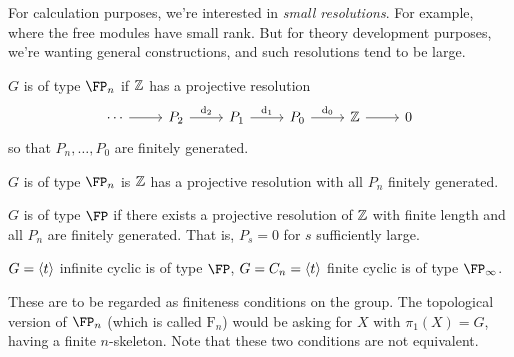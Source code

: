 \documentclass{article}
\begin{document}
For calculation purposes, we're interested in \emph{small resolutions}. For example, where the free modules have small rank. But for theory development purposes, we're wanting general constructions, and such resolutions tend to be large.

\begin{definition}
    \(G\) is of type \(\FP_n\) if \(\mathbb{Z}\) has a projective resolution
    \[\begin{tikzcd}
        \cdots & {P_2} & {P_1} & {P_0} & \Z & 0
        \arrow[from=1-1, to=1-2]
        \arrow["{\dd_2}", from=1-2, to=1-3]
        \arrow["{\dd_1}", from=1-3, to=1-4]
        \arrow["{\dd_0}", from=1-4, to=1-5]
        \arrow[from=1-5, to=1-6]
    \end{tikzcd}\]
    so that \(P_n, \dots, P_0\) are finitely generated. 
    
    \(G\) is of type \(\FP_n\) is \(\mathbb{Z}\) has a projective resolution with all \(P_n\) finitely generated. 
    
    \(G\) is of type \(\FP\) if there exists a projective resolution of \(\mathbb{Z}\) with finite length and all \(P_n\) are finitely generated. That is, \(P_s = 0\) for \(s\) sufficiently large.
\end{definition}

\begin{example}
    \(G = \left\langle t \right\rangle\) infinite cyclic is of type \(\FP\), \(G = C_n = \left\langle t \right\rangle\) finite cyclic is of type \(\FP_\infty\).
\end{example}

These are to be regarded as finiteness conditions on the group. The topological version of \(\FP_n\) (which is called \(\mathrm{F}_n\)) would be asking for \(X\) with \(\pi_1(X) = G\), having a finite \(n\)-skeleton. Note that these two conditions are not equivalent.
\end{document}

